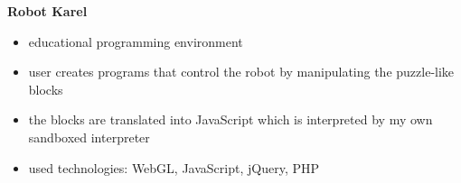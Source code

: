 \documentclass[]{friggeri-cv}
\begin{document}
\textbf{Robot Karel}
\begin{itemize}
  \item educational programming environment
  \item user creates programs that control the robot by manipulating the puzzle-like blocks
  \item the blocks are translated into JavaScript which is interpreted by my own sandboxed interpreter
  \item used technologies: WebGL, JavaScript, jQuery, PHP
\end{itemize}
\end{document}
